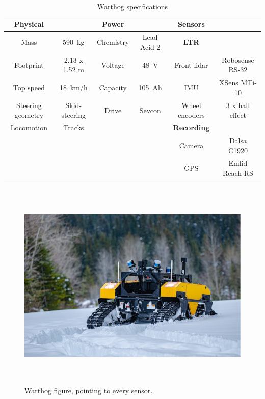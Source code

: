 \begin{table}[htpb]
	\caption{Warthog specifications} \label{tab:warthog_specs}
	\begin{center}
		\begin{tabular}{c c | c c | c c}
			\textbf{Physical} &  & \textbf{Power} &  & \textbf{Sensors} & \\
			\hline
			Mass & \SI{590}{kg} & Chemistry & Lead Acid 2 & \textbf{\ac{LTR}} \\ 
			Footprint & 2.13 x 1.52 m & Voltage & \SI{48}{V} & Front lidar & Robosense RS-32   \\ 
			Top speed & \SI{18}{km/h} & Capacity & \SI{105}{Ah} & \ac{IMU} & XSens MTi-10 \\ 
			Steering geometry & Skid-steering  & Drive & Sevcon & Wheel encoders & 3 x hall effect \\ 
			Locomotion & Tracks  & & & \textbf{Recording}   \\
			&  & & & Camera & Dalsa C1920    \\
			& & & & \ac{GPS} & Emlid Reach-RS \\
			\hline
		\end{tabular}
	\end{center}
\end{table}

\begin{figure} [htpb]
	\centering
	\includegraphics[height=4.0in]{figs/warthog_sys_description.pdf}
	\caption{Warthog figure, pointing to every sensor.}
	\label{fig:warthog}
\end{figure}

